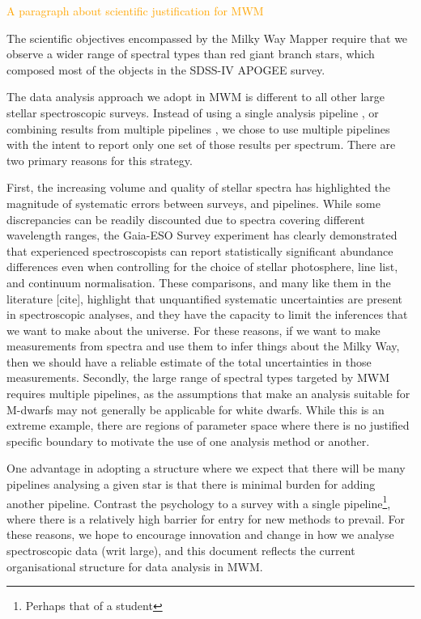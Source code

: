 \documentclass[modern]{aastex631}
\newcommand{\todo}[1]{\textcolor{orange}{#1}}
\begin{document}
\todo{A paragraph about scientific justification for MWM}

The scientific objectives encompassed by the Milky Way Mapper require that we observe a wider range of spectral types than red giant branch stars, which composed most of the objects in the SDSS-IV APOGEE survey.

The data analysis approach we adopt in MWM is different to all other large stellar spectroscopic surveys.
Instead of using a single analysis pipeline \citep{galah}, or combining results from multiple pipelines \citep{ges}, we chose to use multiple pipelines with the intent to report only one set of those results per spectrum.
There are two primary reasons for this strategy.

First, the increasing volume and quality of stellar spectra has highlighted the magnitude of systematic errors between surveys, and pipelines. While some discrepancies can be readily discounted due to spectra covering different wavelength ranges, the Gaia-ESO Survey experiment has clearly demonstrated that experienced spectroscopists can report statistically significant abundance differences even when controlling for the choice of stellar photosphere, line list, and continuum normalisation.
These comparisons, and many like them in the literature [cite], highlight that unquantified systematic uncertainties are present in spectroscopic analyses, and they have the capacity to limit the inferences that we want to make about the universe.
For these reasons, if we want to make measurements from spectra and use them to infer things about the Milky Way, then we should have a reliable estimate of the total uncertainties in those measurements.
Secondly, the large range of spectral types targeted by MWM requires multiple pipelines, as the assumptions that make an analysis suitable for M-dwarfs may not generally be applicable for white dwarfs.
While this is an extreme example, there are regions of parameter space where there is no justified specific boundary to motivate the use of one analysis method or another.

One advantage in adopting a structure where we expect that there will be many pipelines analysing a given star is that there is minimal burden for adding another pipeline. Contrast the psychology to a survey with a single pipeline\footnote{Perhaps that of a student}, where there is a relatively high barrier for entry for new methods to prevail. For these reasons, we hope to encourage innovation and change in how we analyse spectroscopic data (writ large), and this document reflects the current organisational structure for data analysis in MWM.
\end{document}

